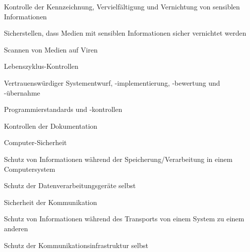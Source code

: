 \documentclass[a4paper]{article}
\begin{document}
\begin{multicols}{3}
\begin{itemize*}
\begin{itemize*}
                  \item Kontrolle der Kennzeichnung, Vervielfältigung und Vernichtung von sensiblen Informationen
                  \item Sicherstellen, dass Medien mit sensiblen Informationen sicher vernichtet werden
                  \item Scannen von Medien auf Viren
            \end{itemize*}
            \item Lebenszyklus-Kontrollen
            \begin{itemize*}
                  \item Vertrauenswürdiger Systementwurf, -implementierung, -bewertung und -übernahme
                  \item Programmierstandards und -kontrollen
                  \item Kontrollen der Dokumentation
            \end{itemize*}
            \item Computer-Sicherheit
            \begin{itemize*}
                  \item Schutz von Informationen während der Speicherung/Verarbeitung in einem Computersystem
                  \item Schutz der Datenverarbeitungsgeräte selbst
            \end{itemize*}
            \item Sicherheit der Kommunikation
            \begin{itemize*}
                  \item Schutz von Informationen während des Transports von einem System zu einem anderen
                  \item Schutz der Kommunikationsinfrastruktur selbst
            \end{itemize*}
      \end{itemize*}


\end{multicols}
\end{document}
